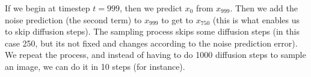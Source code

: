 If we begin at timestep $t = 999$, then we predict $x_0$ from $x_999$. Then we add the noise prediction (the second term) to $x_999$ to get to $x_750$ (this is what enables us to skip diffusion steps). The sampling process skips some diffusion steps (in this case 250, but its not fixed and changes according to the noise prediction error). We repeat the process, and instead of having to do 1000 diffusion steps to sample an image, we can do it in 10 steps (for instance).










